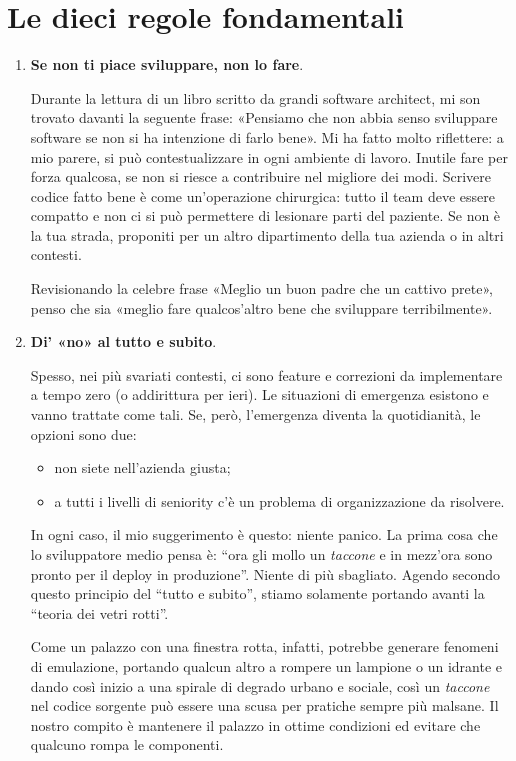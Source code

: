\section{Le dieci regole fondamentali}

\begin{enumerate}

\item \textbf{Se non ti piace sviluppare, non lo fare}.

Durante la lettura di un libro scritto da grandi software architect, mi son trovato davanti la seguente frase: «Pensiamo che non abbia senso sviluppare software se non si ha intenzione di farlo bene».
Mi ha fatto molto riflettere: a mio parere, si può contestualizzare in ogni ambiente di lavoro. Inutile fare per forza qualcosa, se non si riesce a contribuire nel migliore dei modi. Scrivere codice fatto bene è come un’operazione chirurgica: tutto il team deve essere compatto e non ci si può permettere di lesionare parti del paziente. Se non è la tua strada, proponiti per un altro dipartimento della tua azienda o in altri contesti. 

Revisionando la celebre frase «Meglio un buon padre che un cattivo prete», penso che sia «meglio fare qualcos’altro bene che sviluppare terribilmente».

\item \textbf{Di’ «no» al tutto e subito}.

Spesso, nei più svariati contesti, ci sono feature e correzioni da implementare a tempo zero (o addirittura per ieri). Le situazioni di emergenza esistono e vanno trattate come tali. Se, però, l’emergenza diventa la quotidianità, le opzioni sono due:
	\begin{itemize}
		\item non siete nell'azienda giusta;
		\item a tutti i livelli di seniority c'è un problema di organizzazione da risolvere.
	\end{itemize}

In ogni caso, il mio suggerimento è questo: niente panico. La prima cosa che lo sviluppatore medio pensa è: “ora gli mollo un \emph{taccone} e in mezz’ora sono pronto per il deploy in produzione”. Niente di più sbagliato. Agendo secondo questo principio del “tutto e subito”, stiamo solamente portando avanti la “teoria dei vetri rotti”.

Come un palazzo con una finestra rotta, infatti, potrebbe generare fenomeni di emulazione, portando qualcun altro a rompere un lampione o un idrante e dando così inizio a una spirale di degrado urbano e sociale, così un \emph{taccone} nel codice sorgente può essere una scusa per pratiche sempre più malsane. Il nostro compito è mantenere il palazzo in ottime condizioni ed evitare che qualcuno rompa le componenti.


\end{enumerate}
